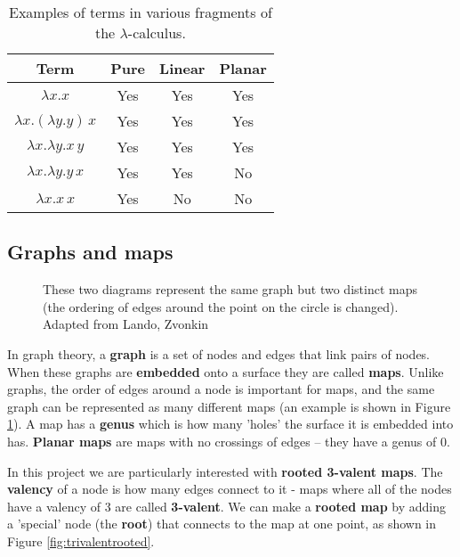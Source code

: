\documentclass[12pt]{article}
\begin{document}
\begin{table}
    \centering
    \begin{tabular}{|c|c|c|c|}
        \hline
        \textbf{Term} & \textbf{Pure} & \textbf{Linear} & \textbf{Planar} \\
        \hline
        $\lambda x. x$ & Yes & Yes & Yes \\
        \hline
        $\lambda x. (\lambda y. y) \, x$ & Yes & Yes & Yes \\
        \hline
        $\lambda x.\lambda y. x \, y$ & Yes & Yes & Yes \\
        \hline
        $\lambda x. \lambda y. y \, x$ & Yes & Yes & No \\
        \hline
        $\lambda x. x \, x$ & Yes & No & No \\
        \hline
    \end{tabular}
    \caption{Examples of terms in various fragments of the $\lambda$-calculus.}
    \label{tab:fragments}
\end{table}

\subsection{Graphs and maps}

\begin{figure}
    \centering
    
    \caption{These two diagrams represent the same graph but two distinct maps (the ordering of edges around the point on the circle is changed). Adapted from Lando, Zvonkin {\cite{graphs}}}
    \label{fig:maps}
\end{figure}

In graph theory, a \textbf{graph} is a set of nodes and edges that link pairs of nodes. When these graphs are \textbf{embedded} onto a surface they are called \textbf{maps}. Unlike graphs, the order of edges around a node is important for maps, and the same graph can be represented as many different maps (an example is shown in Figure \ref{fig:maps}). A map has a \textbf{genus} which is how many 'holes' the surface it is embedded into has. \textbf{Planar maps} are maps with no crossings of edges -- they have a genus of 0. 

In this project we are particularly interested with \textbf{rooted 3-valent maps}. The \textbf{valency} of a node is how many edges connect to it - maps where all of the nodes have a valency of 3 are called \textbf{3-valent}. We can make a \textbf{rooted map} by adding a 'special' node (the \textbf{root}) that connects to the map at one point, as shown in Figure \ref{fig:trivalentrooted}.
\end{document}
